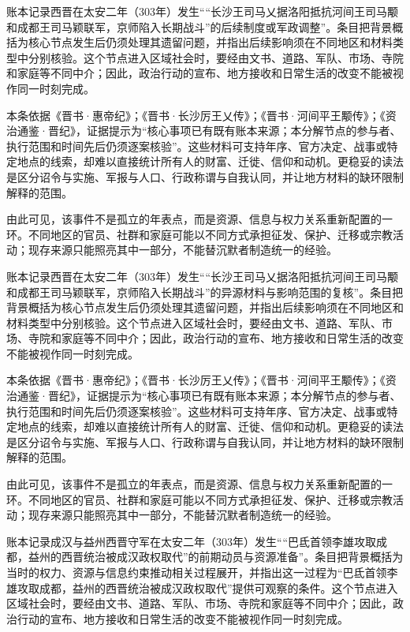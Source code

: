 账本记录西晋在太安二年（303年）发生““长沙王司马乂据洛阳抵抗河间王司马颙和成都王司马颖联军，京师陷入长期战斗”的后续制度或军政调整”。条目把背景概括为核心节点发生后仍须处理其遗留问题，并指出后续影响须在不同地区和材料类型中分别核验。这个节点进入区域社会时，要经由文书、道路、军队、市场、寺院和家庭等不同中介；因此，政治行动的宣布、地方接收和日常生活的改变不能被视作同一时刻完成。

本条依据《晋书·惠帝纪》；《晋书·长沙厉王乂传》；《晋书·河间平王颙传》；《资治通鉴·晋纪》，证据提示为“核心事项已有既有账本来源；本分解节点的参与者、执行范围和时间先后仍须逐案核验”。这些材料可支持年序、官方决定、战事或特定地点的线索，却难以直接统计所有人的财富、迁徙、信仰和动机。更稳妥的读法是区分诏令与实施、军报与人口、行政称谓与自我认同，并让地方材料的缺环限制解释的范围。

由此可见，该事件不是孤立的年表点，而是资源、信息与权力关系重新配置的一环。不同地区的官员、社群和家庭可能以不同方式承担征发、保护、迁移或宗教活动；现存来源只能照亮其中一部分，不能替沉默者制造统一的经验。

账本记录西晋在太安二年（303年）发生““长沙王司马乂据洛阳抵抗河间王司马颙和成都王司马颖联军，京师陷入长期战斗”的异源材料与影响范围的复核”。条目把背景概括为核心节点发生后仍须处理其遗留问题，并指出后续影响须在不同地区和材料类型中分别核验。这个节点进入区域社会时，要经由文书、道路、军队、市场、寺院和家庭等不同中介；因此，政治行动的宣布、地方接收和日常生活的改变不能被视作同一时刻完成。

本条依据《晋书·惠帝纪》；《晋书·长沙厉王乂传》；《晋书·河间平王颙传》；《资治通鉴·晋纪》，证据提示为“核心事项已有既有账本来源；本分解节点的参与者、执行范围和时间先后仍须逐案核验”。这些材料可支持年序、官方决定、战事或特定地点的线索，却难以直接统计所有人的财富、迁徙、信仰和动机。更稳妥的读法是区分诏令与实施、军报与人口、行政称谓与自我认同，并让地方材料的缺环限制解释的范围。

由此可见，该事件不是孤立的年表点，而是资源、信息与权力关系重新配置的一环。不同地区的官员、社群和家庭可能以不同方式承担征发、保护、迁移或宗教活动；现存来源只能照亮其中一部分，不能替沉默者制造统一的经验。

账本记录成汉与益州西晋守军在太安二年（303年）发生““巴氐首领李雄攻取成都，益州的西晋统治被成汉政权取代”的前期动员与资源准备”。条目把背景概括为当时的权力、资源与信息约束推动相关过程展开，并指出这一过程为“巴氐首领李雄攻取成都，益州的西晋统治被成汉政权取代”提供可观察的条件。这个节点进入区域社会时，要经由文书、道路、军队、市场、寺院和家庭等不同中介；因此，政治行动的宣布、地方接收和日常生活的改变不能被视作同一时刻完成。


